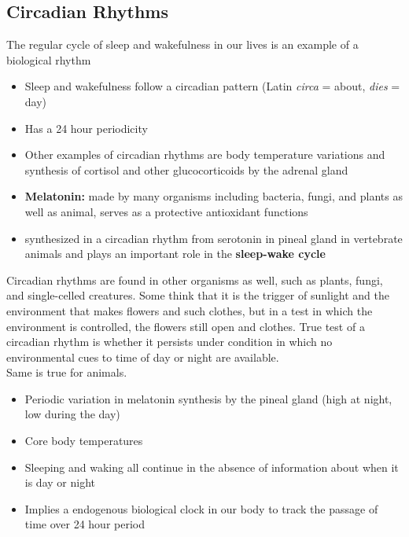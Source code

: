 \documentclass{article}
\begin{document}
\subsection{Circadian Rhythms}
The regular cycle of sleep and wakefulness in our lives is an example of a biological rhythm
\begin{itemize}
    \item Sleep and wakefulness follow a circadian pattern (Latin \textit{circa} = about, \textit{dies} = day) 
    \item Has a 24 hour periodicity
    \item Other examples of circadian rhythms are body temperature variations and synthesis of cortisol and other glucocorticoids by the adrenal gland
    \item  \textbf{Melatonin:} made by many organisms including bacteria, fungi, and plants as well as animal, serves as a protective antioxidant functions
    \item synthesized in a circadian rhythm from serotonin in pineal gland in vertebrate animals and plays an important role in the \textbf{sleep-wake cycle}
\end{itemize}

Circadian rhythms are found in other organisms as well, such as plants, fungi, and single-celled creatures. Some think that it is the trigger of sunlight and the environment that makes flowers and such clothes, but in a test in which the environment is controlled, the flowers still open and clothes. True test of a circadian rhythm is whether it persists under condition in which no environmental cues to time of day or night are available. \\

Same is true for animals. 
\begin{itemize}
    \item Periodic variation in melatonin synthesis by the pineal gland (high at night, low during the day) 
    \item Core body temperatures 
    \item Sleeping and waking all continue in the absence of information about when it is day or night
    \item Implies a endogenous biological clock in our body to track the passage of time over 24 hour period
\end{itemize}
\end{document}
